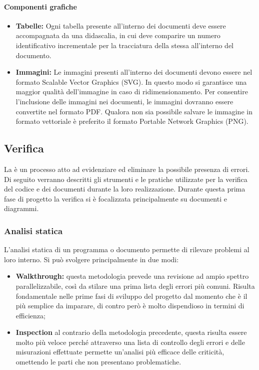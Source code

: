 \paragraph{Componenti grafiche}
	\begin{itemize}
	\item \textbf{Tabelle:} 
	Ogni tabella presente all'interno dei documenti deve essere accompagnata da una didascalia,	in cui deve comparire un numero identificativo incrementale per la tracciatura della stessa all'interno del documento.
	\item \textbf{Immagini:}
	Le immagini presenti all'interno dei documenti devono essere nel formato Scalable Vector Graphics (SVG). In questo modo si garantisce una maggior qualità dell'immagine in caso di ridimensionamento. Per consentire l’inclusione delle immagini nei documenti,
	le immagini dovranno essere convertite nel formato PDF. Qualora non sia possibile
	salvare le immagine in formato vettoriale è preferito il formato Portable Network
	Graphics (PNG).

	\end{itemize}
\subsection{Verifica}
La  è un processo atto ad evidenziare ed eliminare la possibile presenza di errori.
Di seguito verranno descritti gli strumenti e le pratiche utilizzate per la verifica del codice e dei documenti durante la loro realizzazione.
Durante questa prima fase di progetto la verifica si è focalizzata principalmente su documenti e diagrammi.
\subsubsection{Analisi statica}
L'analisi statica di un programma o documento permette di rilevare problemi al loro interno. Si può svolgere principalmente in due modi:
\begin{itemize}
\item \textbf{Walkthrough:} questa metodologia prevede una revisione ad ampio spettro parallelizzabile, così da stilare una prima lista degli errori più comuni. Risulta fondamentale nelle prime fasi di sviluppo del progetto dal momento che è il più semplice da imparare, di contro però è molto dispendioso in termini di efficienza;
\item \textbf{Inspection} al contrario della metodologia precedente, questa risulta essere molto più veloce perché attraverso una lista di controllo degli errori e delle misurazioni effettuate permette un'analisi più efficace delle criticità, omettendo le parti che non presentano problematiche. 
\end{itemize}
